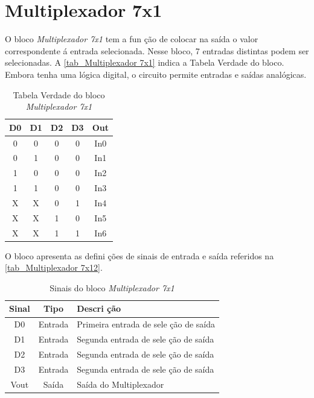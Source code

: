 \renewcommand{\NomeBloco}{\emph{Multiplexador 7x1}}
\renewcommand{\NomeBlocoNoIt}{Multiplexador 7x1}
\renewcommand{\NomePTab}{tab_\NomeBlocoNoIt}
\renewcommand{\NomeSTab}{tab_\NomeBlocoNoIt2}
\renewcommand{\NomePFig}{fig_\NomeBlocoNoIt}
\renewcommand{\NomeSFig}{fig_\NomeBlocoNoIt2}
\renewcommand{\NomeTTab}{tab_\NomeBlocoNoIt3}

\section{Multiplexador 7x1}

O bloco \NomeBloco{} tem a fun ção de colocar na sa\'ida o valor correspondente \'a entrada selecionada. Nesse bloco, 7 entradas distintas podem ser selecionadas. A \autoref{\NomePTab} indica a Tabela Verdade do bloco. Embora tenha uma l\'ogica digital, o circuito permite entradas e sa\'idas anal\'ogicas.

\begin{table}[htbp]

\caption{Tabela Verdade do bloco \NomeBloco}%
\label{\NomePTab}
\centering
\begin{tabular}{ccccc}
    \toprule
    D0 & D1 & D2 & D3 & Out \\
    \midrule \midrule
    0 & 0 & 0 & 0 & In0 \\
    \midrule
    0 & 1 & 0 & 0 & In1 \\
    \midrule
    1 & 0 & 0 & 0 & In2 \\
    \midrule
    1 & 1 & 0 & 0 & In3 \\
    \midrule
    X & X & 0 & 1 & In4 \\
    \midrule
    X & X & 1 & 0 & In5 \\
    \midrule
    X & X & 1 & 1 & In6 \\
\bottomrule

\end{tabular}
\end{table}

O bloco apresenta as defini ções de sinais de entrada e sa\'ida referidos na \autoref{\NomeSTab}.

\begin{table}[htbp]
\caption{Sinais do bloco \NomeBloco}
\label{\NomeSTab}
\centering
\begin{tabular}{ccl}

    \toprule
    Sinal & Tipo    & Descri ção        \\
    \midrule \midrule
    D0    & Entrada & Primeira entrada de sele ção de sa\'ida \\
    \midrule
    D1    & Entrada & Segunda entrada de sele ção de sa\'ida \\
    \midrule
    D2    & Entrada & Segunda entrada de sele ção de sa\'ida \\
    \midrule
    D3    & Entrada & Segunda entrada de sele ção de sa\'ida \\
    \midrule
    Vout & Sa\'ida & Sa\'ida do Multiplexador\\
    \midrule
    \bottomrule
\end{tabular}
\end{table}

